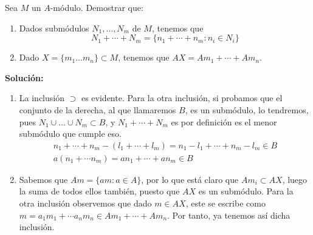 \begin{ejercicio}
    Sea $M$ un $A$-módulo. Demostrar que:
    \begin{enumerate}
        \item Dados submódulos $N_1, \ldots, N_m$ de $M$, tenemos que 
        \begin{equation*}
            N_1 + \cdots + N_m = \{n_1 + \cdots+ n_m : n_i \in N_i\}
        \end{equation*}
        \item Dado $X = \{m_1\ldots m_n\} \subset M$, tenemos que $AX = Am_1 + \cdots + Am_n$. 
    \end{enumerate}
   
    
    \noindent
    \textbf{Solución:}
    \begin{enumerate}
        \item La inclusión $\supset$ es evidente. Para la otra inclusión, si probamos que el conjunto de la derecha, al que llamaremos $B$, es un submódulo, lo tendremos, pues $N_1 \cup \ldots\cup N_m \subset B$, y $N_1 + \cdots + N_m$ es por definición es el menor submódulo que cumple eso. 
            \begin{gather*}
                n_1 + \cdots + n_m - (l_1 + \cdots + l_m) = n_1 - l_1 + \cdots + n_m - l_m \in B \\
                a(n_1 + \cdots n_m) = an_1+ \cdots + an_m \in B
            \end{gather*}
        \item Sabemos que $Am = \{am : a \in A\}$, por lo que está claro que $Am_i \subset AX$, luego la suma de todos ellos también, puesto que $AX$ es un submódulo. Para la otra inclusión observemos que dado $m \in AX$, este se escribe como $m = a_1m_1 + \cdots a_nm_n \in Am_1 + \cdots + Am_n$. Por tanto, ya tenemos así dicha inclusión. 
    \end{enumerate}
\end{ejercicio}

